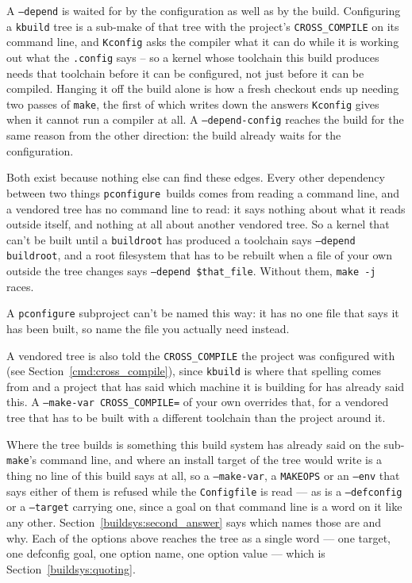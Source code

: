 \documentclass{article}
\newcommand{\pconfigure}{\texttt{pconfigure}}
\begin{document}
\begin{itemize}
  A \texttt{--depend} is waited for by the configuration as well as by
  the build.  Configuring a \texttt{kbuild} tree is a sub-make of that
  tree with the project's \texttt{CROSS\_COMPILE} on its command line,
  and \texttt{Kconfig} asks the compiler what it can do while it is
  working out what the \texttt{.config} says -- so a kernel whose
  toolchain this build produces needs that toolchain before it can be
  configured, not just before it can be compiled.  Hanging it off the
  build alone is how a fresh checkout ends up needing two passes of
  \texttt{make}, the first of which writes down the answers
  \texttt{Kconfig} gives when it cannot run a compiler at all.  A
  \texttt{--depend-config} reaches the build for the same reason from
  the other direction: the build already waits for the configuration.

  Both exist because nothing else can find these edges.  Every other
  dependency between two things \pconfigure\ builds comes from
  reading a command line, and a vendored tree has no command line to
  read: it says nothing about what it reads outside itself, and
  nothing at all about another vendored tree.  So a kernel that can't
  be built until a \texttt{buildroot} has produced a toolchain says
  \texttt{--depend buildroot}, and a root filesystem that has to be
  rebuilt when a file of your own outside the tree changes says
  \texttt{--depend \$that\_file}.  Without them, \texttt{make -j}
  races.

  A \texttt{pconfigure} subproject can't be named this way: it has no
  one file that says it has been built, so name the file you actually
  need instead.
\end{itemize}

A vendored tree is also told the \texttt{CROSS\_COMPILE} the project
was configured with (see Section~\ref{cmd:cross_compile}), since
\texttt{kbuild} is where that spelling comes from and a project that
has said which machine it is building for has already said this.  A
\texttt{--make-var CROSS\_COMPILE=} of your own overrides that, for a
vendored tree that has to be built with a different toolchain than the
project around it.

Where the tree builds is something this build system has already said
on the sub-\texttt{make}'s command line, and where an install target
of the tree would write is a thing no line of this build says at all,
so a \texttt{--make-var}, a \texttt{MAKEOPS} or an \texttt{--env}
that says either of them is refused while the \texttt{Configfile} is
read --- as is a \texttt{--defconfig} or a \texttt{--target}
carrying one, since a goal on that command line is a word on it like
any other.
Section~\ref{buildsys:second_answer} says which names those are and
why.  Each of the options above reaches the tree as a single word ---
one target, one defconfig goal, one option name, one option value ---
which is Section~\ref{buildsys:quoting}.
\end{document}
